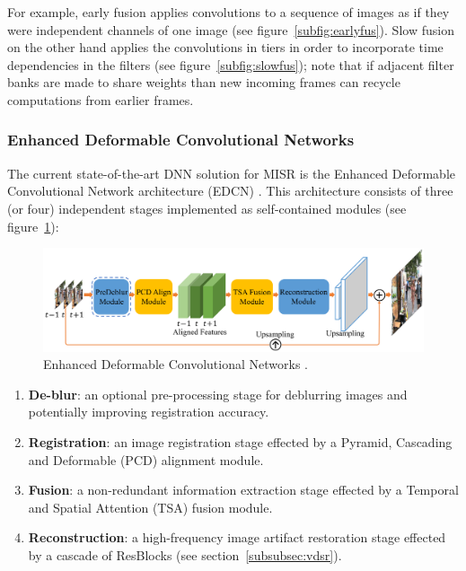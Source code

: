 %
For example, early fusion applies convolutions to a sequence of images as if they were independent channels of one image (see figure~\ref{subfig:earlyfus}).
%
Slow fusion on the other hand applies the convolutions in tiers in order to incorporate time dependencies in the filters (see figure~\ref{subfig:slowfus}); note that if adjacent filter banks are made to share weights than new incoming frames can recycle computations from earlier frames.




\subsubsection{Enhanced Deformable Convolutional Networks}



The current state-of-the-art DNN solution for MISR is the Enhanced Deformable Convolutional Network architecture (EDCN) \cite{wang2019edvr}.
%
This architecture consists of three (or four) independent stages implemented as self-contained modules (see figure~\ref{fig:edvr}): 
\begin{figure}[!htbp]
    \includegraphics[width=\textwidth]{figures/neural_networks/edvr.png}
    \caption[]{Enhanced Deformable Convolutional Networks \cite{wang2019edvr}.}\label{fig:edvr}
\end{figure}
\begin{mdframed}
    \begin{enumerate}
        \item \textbf{De-blur}: an optional pre-processing stage for deblurring images and potentially improving registration accuracy.
        \item \textbf{Registration}: an image registration stage effected by a Pyramid, Cascading and Deformable (PCD) alignment module.
        \item \textbf{Fusion}: a non-redundant information extraction stage effected by a Temporal and Spatial Attention (TSA) fusion module.
        \item \textbf{Reconstruction}: a high-frequency image artifact restoration stage effected by a cascade of ResBlocks (see section~\ref{subsubsec:vdsr}).
    \end{enumerate}
\end{mdframed}

